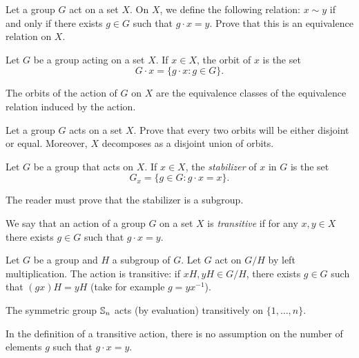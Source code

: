 \begin{exercise}
    Let a group $G$ act on a set $X$. 
    On $X$, we define the following relation: $x\sim y$ if and only if
    there exists $g\in G$ such that $g\cdot x=y$. Prove 
    that this is an equivalence relation on $X$. 
\end{exercise}

\begin{definition}
Let $G$ be a group acting on a set $X$. If $x\in X$, the
orbit of $x$ is the set
\[
G\cdot x=\{g\cdot x:g\in G\}.
\]
\end{definition}

The orbits of the action of $G$ on $X$ are 
the equivalence classes of the equivalence 
relation induced by the action. 

\begin{exercise}
    Let a group $G$ acts on a set $X$. Prove that 
    every two orbits will be either disjoint or equal. Moreover, 
    $X$ decomposes as a disjoint union of orbits. 
\end{exercise}

\begin{definition}
        Let $G$ be a group that acts on $X$. If $x\in X$, the \emph{stabilizer} of $x$ in $G$
        is the set   
        \[
        G_x=\{g\in G:g\cdot x=x\}.
        \]
\end{definition}

The reader must prove that the stabilizer is a subgroup. 

\begin{definition}
We say that an action of a group $G$ on a set $X$
is \emph{transitive} if for any $x,y\in X$ there exists $g\in G$ such that $g\cdot x=y$.
\end{definition}

\begin{example}
    Let $G$ be a group and $H$ a subgroup of $G$. Let $G$ act
    on $G/H$ by left multiplication. The action is transitive: if 
    $xH,yH\in G/H$, there exists $g\in G$ such that
    $(gx)H=yH$ (take for example $g=yx^{-1}$). 
\end{example}

\begin{example}
The symmetric group $\mathbb{S}_n$ acts (by evaluation) transitively 
on $\{1,\dots,n\}$.
\end{example}

In the definition of a transitive action, there is no assumption
on the number of elements $g$ such that $g\cdot x=y$.

